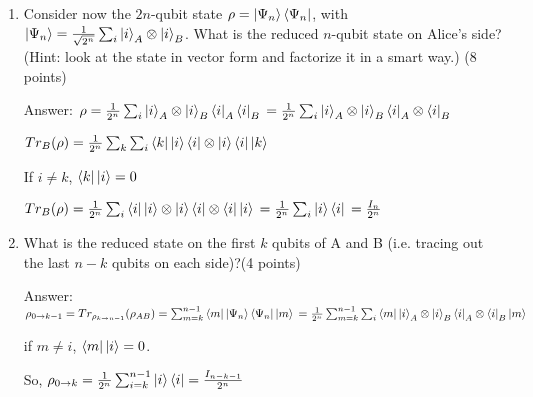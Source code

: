 \documentclass{article}
\begin{document}
\begin{enumerate}
    \item Consider now the $2n$-qubit state $\rho = \ket{\Psi_n}\bra{\Psi_n}$, with $\ket{\Psi_n} = \frac{1}{\sqrt{2^n}}\sum_i \ket{i}_A \otimes \ket{i}_B$. What is the reduced $n$-qubit state on Alice's side? (Hint: look at the state in vector form and factorize it in a smart way.) (8 points)


          Answer: $\rho=\frac{1}{2^n}\sum_i\ket{i}_A\otimes \ket{i}_B\bra{i}_A\bra{i}_B
              \\=\frac{1}{2^n}\sum_i\ket{i}_A\otimes\ket{i}_B\bra{i}_A\otimes\bra{i}_B
          $

          $Tr_B(\rho)=\frac{1}{2^n}\sum_k\sum_i\bra{k}\ket{i}\bra{i}\otimes\ket{i}\bra{i}\ket{k}$

          If $i\neq k$, $\bra{k}\ket{i}=0$


          $Tr_B(\rho)=\frac{1}{2^n}\sum_i\bra{i}\ket{i}\otimes\ket{i}\bra{i}\otimes\bra{i}\ket{i}
              \\=\frac{1}{2^n}\sum_i\ket{i}\bra{i}
              \\=\frac{I_n}{2^n}
          $
    \item What is the reduced state on the first $k$ qubits of A and B (i.e. tracing out the last $n - k$ qubits on each side)?(4 points)

          Answer: $\rho_{0 \to k-1} = Tr_{\rho_{k \to n-1}}(\rho_{AB}) = \sum_{m=k}^{n-1}\bra{m}\ket{\Psi_n}\bra{\Psi_n}\ket{m}
              \\=\frac{1}{2^n}\sum_{m=k}^{n-1}\sum_i\bra{m}\ket{i}_A\otimes\ket{i}_B\bra{i}_A\otimes\bra{i}_B\ket{m}
          $

          if $m\neq i$, $\bra{m}\ket{i}=0$.

          So, $\rho_{0 \to k}=\frac{1}{2^n}\sum_{i=k}^{n-1}\ket{i}\bra{i}=\frac{I_{n-k-1}}{2^n}$
\end{enumerate}
\end{document}
